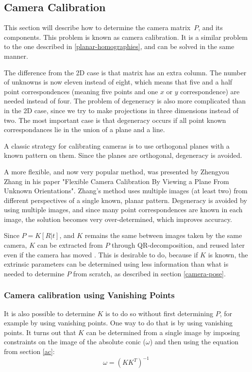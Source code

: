 \subsection{Camera Calibration} \label{camera-calibration}
This section will describe how to determine the camera matrix $P$, and its components.
This problem is known as camera calibration.
It is a similar problem to the one described in \ref{planar-homographies}, and can be solved in the same manner.

The difference from the 2D case is that matrix has an extra column. The number of unknowns is now eleven instead of eight, which means that five and a half point correspondences (meaning five points and one $x$ or $y$ correspondence) are needed instead of four.
The problem of degeneracy is also more complicated than in the 2D case, since we try to make projections in three dimensions instead of two.
The most important case is that degeneracy occurs if all point known correspondances lie in the union of a plane and a line. \cite[179-180]{hartley-zisserman}

A classic strategy for calibrating cameras is to use orthogonal planes with a known pattern on them. 
Since the planes are orthogonal, degeneracy is avoided.

A more flexible, and now very popular method, was presented by Zhengyou Zhang in his paper "Flexible Camera Calibration By Viewing a Plane From Unknown Orientations".
Zhang's method uses multiple images (at least two) from different perspectives of a single known, planar pattern.
Degeneracy is avoided by using multiple images, and since many point correspondences are known in each image, the solution becomes very over-determined, which improves accuracy. \cite{zhang-calibration}

Since $P=K[R|t]$, and $K$ remains the same between images taken by the same camera, $K$ can be extracted from $P$ through QR-decomposition, and reused later even if the camera has moved \cite{wiki:qr-decomposition}. 
This is desirable to do, because if $K$ is known, the extrinsic parameters can be determined using less information than what is needed to determine $P$ from scratch, as described in section \ref{camera-pose}.

\subsubsection{Camera calibration using Vanishing Points}
It is also possible to determine $K$ is to do so without first determining $P$, for example by using vanishing points.
One way to do that is by using vanishing points.
It turns out that $K$ can be determined from a single image by imposing constraints on the image of the absolute conic ($\omega$) and then using the equation from section \ref{ac}:
\begin{equation} \label{eq:conic_k}
	\omega = (KK^T)^{-1}
\end{equation}

